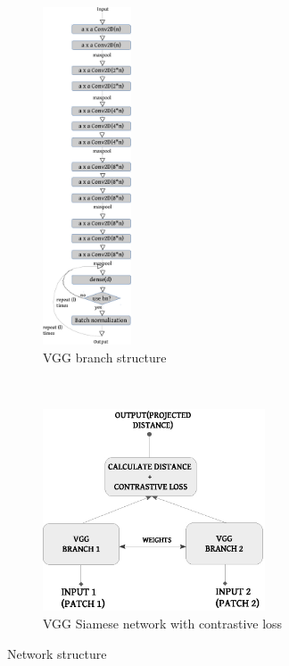 \begin{figure}
    \centering
    \begin{subfigure}[b]{0.4\textwidth}
        \includegraphics[height= 10cm]{images/contrastive/contrastive_loss_vgg_branch}
	\caption{VGG branch structure}
	\label{fig:contrastive_loss_vgg_branch}
    \end{subfigure}
    ~ %
    \begin{subfigure}[b]{0.4\textwidth}
        \includegraphics[height= 6cm]{images/contrastive/siamese_contrastive_loss}
        \caption{VGG Siamese network with contrastive loss}
        \label{fig:siamese_contrastive_loss}
    \end{subfigure}    
    \caption{Network structure}\label{fig:network_structure_vgg_siamese}
\end{figure}

